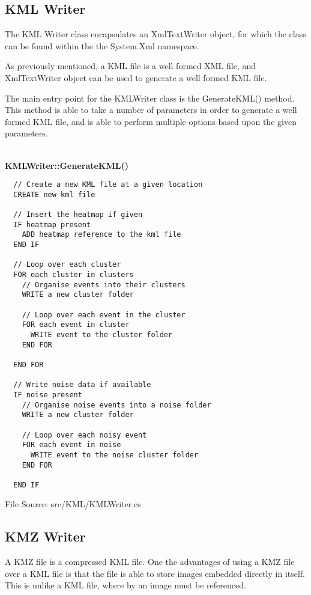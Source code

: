 \subsection{KML Writer}
The KML Writer class encapsulates an {\ttfamily XmlTextWriter} object, for 
which the class can be found within the the {\ttfamily System.Xml} namespace. 

As previously mentioned, a KML file is a well formed XML file, and 
{\ttfamily XmlTextWriter} object can be used to generate a well formed KML 
file.

The main entry point for the KMLWriter class is the {\ttfamily GenerateKML()} 
method. This method is able to take a number of parameters in order to generate
a well formed KML file, and is able to perform multiple options based upon the 
given parameters.

~\\
{\bfseries KMLWriter::GenerateKML()}
\lstset{style=pseudocode}
\begin{lstlisting}
  // Create a new KML file at a given location
  CREATE new kml file

  // Insert the heatmap if given
  IF heatmap present
    ADD heatmap reference to the kml file
  END IF

  // Loop over each cluster
  FOR each cluster in clusters
    // Organise events into their clusters
    WRITE a new cluster folder

    // Loop over each event in the cluster
    FOR each event in cluster
      WRITE event to the cluster folder
    END FOR

  END FOR

  // Write noise data if available
  IF noise present
    // Organise noise events into a noise folder
    WRITE a new cluster folder

    // Loop over each noisy event
    FOR each event in noise
      WRITE event to the noise cluster folder
    END FOR

  END IF
\end{lstlisting}
{\textsf \footnotesize File Source: src/KML/KMLWriter.cs }


\subsection{KMZ Writer}
A KMZ file is a compressed KML file. One the advantages of using a KMZ file 
over a KML file is that the file is able to store images embedded directly in
itself. This is unlike a KML file, where by an image must be referenced.

